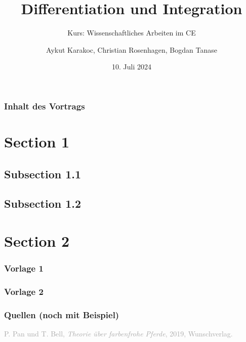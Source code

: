 \documentclass[
aspectratio=169,
design=2023,
german,
accentcolor=TUDa-2c,
author-on-title,
logofile=images/tuda_logo.pdf
]{tudabeamer}
\title{Differentiation und Integration}
\subtitle{\small Kurs: Wissenschaftliches Arbeiten im CE}
\author[Karakoc | Rosenhagen | Tanase]{Aykut Karakoc, Christian Rosenhagen, Bogdan Tanase}
\institute{WACE -- SoSe 2024}
\date{10. Juli 2024}
\begin{document}
	\maketitle
	
	\begin{frame}
		\frametitle{Inhalt des Vortrags}
		\tableofcontents%
	\end{frame}
	
	\section{Section 1}
	\subsection{Subsection 1.1}
	\subsection{Subsection 1.2}
	\section{Section 2}
	
	
	
	\begin{frame}
		\frametitle{Vorlage 1}
	\end{frame}

	\begin{frame}
		\frametitle{Vorlage 2}
	\end{frame}

	\begin{frame} 
	\frametitle{Quellen (noch mit Beispiel)}
		\begin{thebibliography}{9}
			 \textcolor{darkgray}{P. Pan und T. Bell, \emph{Theorie über farbenfrohe Pferde}, 2019, Wunschverlag.}
		\end{thebibliography}
	\end{frame}
\end{document}
